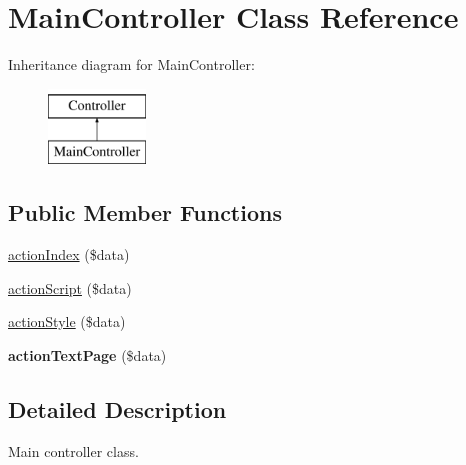 \hypertarget{classMainController}{
\section{MainController Class Reference}
\label{classMainController}
}
Inheritance diagram for MainController:\begin{figure}[H]
\begin{center}
\leavevmode
\includegraphics[height=2.000000cm]{classMainController}
\end{center}
\end{figure}
\subsection*{Public Member Functions}
\begin{DoxyCompactItemize}
\item 
\hyperlink{classMainController_aa26ba0a9bb1cbc705b092d4a5ba386dd}{actionIndex} (\$data)
\item 
\hyperlink{classMainController_aa1324feb6fda13c88bb642d30f57d23b}{actionScript} (\$data)
\item 
\hyperlink{classMainController_ade96657aa5ad9ae6b7e170aa9d4e2977}{actionStyle} (\$data)
\item 
\hypertarget{classMainController_a8b909d8e8df44918b7dab8e7d257c6c3}{
{\bfseries actionTextPage} (\$data)}
\label{classMainController_a8b909d8e8df44918b7dab8e7d257c6c3}

\end{DoxyCompactItemize}


\subsection{Detailed Description}
Main controller class. 

